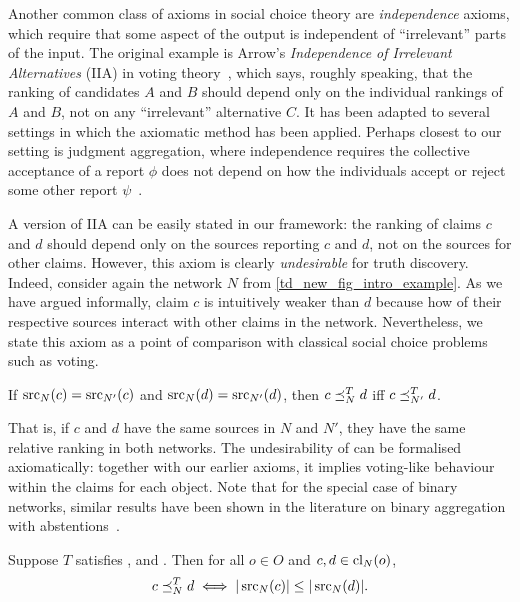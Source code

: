 Another common class of axioms in social choice theory are \emph{independence}
axioms, which require that some aspect of the output is independent of
``irrelevant'' parts of the input. The original example is Arrow's
\emph{Independence of Irrelevant Alternatives} (IIA) in voting
theory~\cite{arrow1952}, which says, roughly speaking, that the ranking of
candidates $A$ and $B$ should depend only on the individual rankings of $A$ and
$B$, not on any ``irrelevant'' alternative $C$. It has been adapted to several
settings in which the axiomatic method has been applied. Perhaps closest to our
setting is judgment aggregation, where independence requires the collective
acceptance of a report $\phi$ does not depend on how the individuals accept or
reject some other report $\psi$~\cite{endriss2016ja}.

A version of IIA can be easily stated in our framework: the ranking of claims
$c$ and $d$ should depend only on the sources reporting $c$ and $d$, not on the
sources for other claims. However, this axiom is clearly \emph{undesirable} for
truth discovery. Indeed, consider again the network $N$ from
\cref{td_new_fig_intro_example}. As we have argued informally, claim $c$ is
intuitively weaker than $d$ because how of their respective sources interact
with other claims in the network. Nevertheless, we state this axiom as a point
of comparison with classical social choice problems such as voting.

\begin{axiom}[\classicalindependence{}]
    If $\operatorname{src}_N(c) = \operatorname{src}_{N'}(c)$ and $\operatorname{src}_N(d) = \operatorname{src}_{N'}(d)$, then $c
    \preceq_N^T d$ iff $c \preceq_{N'}^T d$.
\end{axiom}

That is, if $c$ and $d$ have the same sources in $N$ and $N'$, they have the
same relative ranking in both networks. The undesirability of
\classicalindependence{} can be formalised axiomatically: together with our
earlier axioms, it implies voting-like behaviour within the claims for each
object.\footnotemark{} Note that for the special case of binary networks,
similar results have been shown in the literature on binary aggregation with
abstentions~\cite{christoffbinary}.


\begin{proposition}
    \label{td_new_prop_symm_fpr_ci_voting}
    Suppose $T$ satisfies \symmetry{}, \freshposresp{} and
    \classicalindependence{}. Then for all $o \in O$ and $c, d \in
    \operatorname{cl}_N(o)$,
    \[
        c \preceq_N^T d \iff |\operatorname{src}_N(c)| \le |\operatorname{src}_N(d)|.
    \]
\end{proposition}

